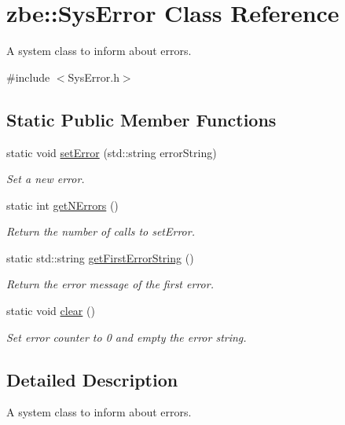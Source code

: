 \hypertarget{classzbe_1_1_sys_error}{}\section{zbe\+:\+:Sys\+Error Class Reference}
\label{classzbe_1_1_sys_error}


A system class to inform about errors.  




{\ttfamily \#include $<$Sys\+Error.\+h$>$}

\subsection*{Static Public Member Functions}
\begin{DoxyCompactItemize}
\item 
static void \hyperlink{classzbe_1_1_sys_error_ac6ec5427abbbb641f5ad8dcd7f42e3fc}{set\+Error} (std\+::string error\+String)
\begin{DoxyCompactList}\small\item\em Set a new error. \end{DoxyCompactList}\item 
static int \hyperlink{classzbe_1_1_sys_error_a76f58259f20be485bbbb6c2ef3da9c61}{get\+N\+Errors} ()
\begin{DoxyCompactList}\small\item\em Return the number of calls to set\+Error. \end{DoxyCompactList}\item 
static std\+::string \hyperlink{classzbe_1_1_sys_error_ae37dcefda00e9c5251825d98df183ce9}{get\+First\+Error\+String} ()
\begin{DoxyCompactList}\small\item\em Return the error message of the first error. \end{DoxyCompactList}\item 
static void \hyperlink{classzbe_1_1_sys_error_aa402e67479e917839290230b47976c5b}{clear} ()
\begin{DoxyCompactList}\small\item\em Set error counter to 0 and empty the error string. \end{DoxyCompactList}\end{DoxyCompactItemize}


\subsection{Detailed Description}
A system class to inform about errors. 

